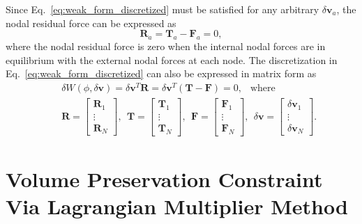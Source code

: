 \documentclass[12pt,aps,pre]{revtex4}
\begin{document}
Since Eq.\ \eqref{eq:weak_form_discretized} must be satisfied for any arbitrary $\delta \pmb{v}_a$, the nodal residual force can be expressed as
%
\begin{equation}
\pmb{R}_a = \pmb{T}_a - \pmb{F}_a = 0,
\end{equation}
%
where the nodal residual force is zero when the internal nodal forces are in equilibrium with the external nodal forces at each node. The discretization in Eq.\ \eqref{eq:weak_form_discretized} can also be expressed in matrix form as
%
\begin{eqnarray}
&&\delta W(\phi,\delta\pmb{v}) = \delta \textbf{v}^T \textbf{R} = \delta \textbf{v}^T (\textbf{T} - \textbf{F})=0, \ \ \text{ where } \nonumber\\
%
&& \textbf{R} = \begin{bmatrix}
\pmb{R}_1 \\ \vdots \\ \pmb{R}_N
\end{bmatrix}, \ \
%
\textbf{T} = \begin{bmatrix}
\pmb{T}_1 \\ \vdots \\ \pmb{T}_N
\end{bmatrix}, \ \
%
\textbf{F} = \begin{bmatrix}
\pmb{F}_1 \\ \vdots \\ \pmb{F}_N
\end{bmatrix}, \ \
%
\delta\textbf{v} = \begin{bmatrix}
\delta\pmb{v}_1 \\ \vdots \\ \delta\pmb{v}_N
\end{bmatrix}.
\end{eqnarray}
%

\section{Volume Preservation Constraint Via Lagrangian Multiplier Method}
\end{document}
